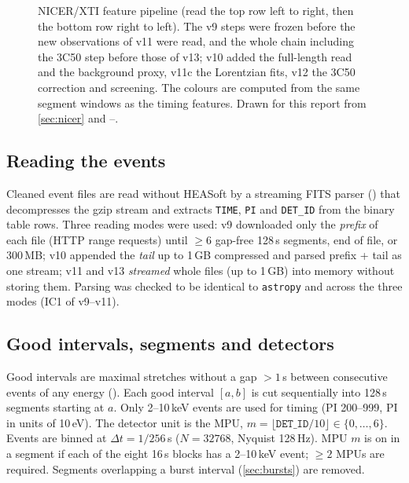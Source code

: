 \begin{figure}[htbp]
\centering

\caption[NICER feature pipeline]{NICER/XTI feature pipeline (read the top row left to right, then the bottom row right to
left). The v9 steps were frozen before the new observations of v11 were read, and the whole chain including the 3C50 step
before those of v13; v10 added the full-length read and the background proxy, v11c the Lorentzian fits, v12 the 3C50
correction and screening. The colours are computed from the same
segment windows as the timing features. Drawn for this report from \cref{sec:nicer} and --.}
\label{fig:nicerflow}
\end{figure}

\subsection{Reading the events}
Cleaned event files are read without HEASoft by a streaming FITS parser () that decompresses
the gzip stream and extracts \texttt{TIME}, \texttt{PI} and \texttt{DET\_ID} from the binary table rows. Three reading
modes were used: v9 downloaded only the \emph{prefix} of each file (HTTP range requests) until $\ge6$ gap-free 128\,s
segments, end of file, or 300\,MB; v10 appended the \emph{tail} up to 1\,GB compressed and parsed prefix + tail as one
stream; v11 and v13 \emph{streamed} whole files (up to 1\,GB) into memory without storing them. Parsing was checked to be
identical to \texttt{astropy} and across the three modes (IC1 of v9--v11).

\subsection{Good intervals, segments and detectors}
Good intervals are maximal stretches without a gap $>1$\,s between consecutive events of any energy
(). Each good interval $[a,b]$ is cut sequentially into 128\,s segments starting at $a$.
Only 2--10\,keV events are used for timing (PI 200--999, PI in units of 10\,eV). The detector unit is the MPU,
$m=\lfloor\mathtt{DET\_ID}/10\rfloor\in\{0,\dots,6\}$. Events are binned at $\Delta t = 1/256$\,s ($N=32768$, Nyquist
128\,Hz). MPU $m$ is on in a segment if each of the eight 16\,s blocks has a 2--10\,keV event; $\ge2$ MPUs are required.
Segments overlapping a burst interval (\cref{sec:bursts}) are removed.

